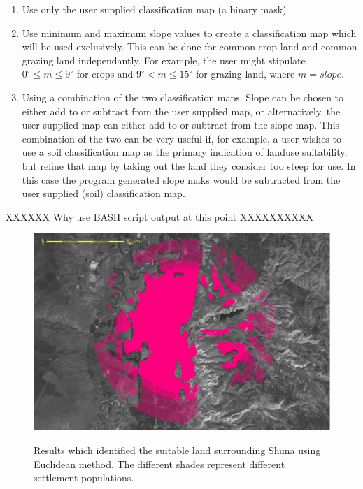 \begin{enumerate} 

\item  Use only the user supplied classification map (a binary mask) 

\item  Use minimum and maximum slope values to create a classification map
which will be used exclusively.  This can be done for common crop land and
common grazing land independantly.  For example, the user might stipulate
$0^\circ \leq m \leq 9^\circ$ for crops and $9^\circ < m \leq 15^\circ$ for
grazing land, where $m=slope$.  

\item  Using a combination of the two classification maps.  Slope can be chosen
to either add to or subtract from the user supplied map, or alternatively, the
user supplied map can either add to or subtract from the slope map.  This
combination of the two can be very useful if, for example, a user wishes to use
a soil classification map as the primary indication of landuse suitability, but
refine that map by taking out the land they consider too steep for use.  In
this case the program generated slope maks would be subtracted from the user
supplied (soil) classification map.  

\end{enumerate}


XXXXXX Why use BASH script output at this point XXXXXXXXXX


  \begin{figure}[htbp] %
  \includegraphics[scale=0.225]{./images/landcatchment.jpg}
   \label{fig:landCatchment} \caption{Results which identified the suitable
         land surrounding Shuna using Euclidean method.
   The different shades represent different settlement populations.}
   \end{figure}

